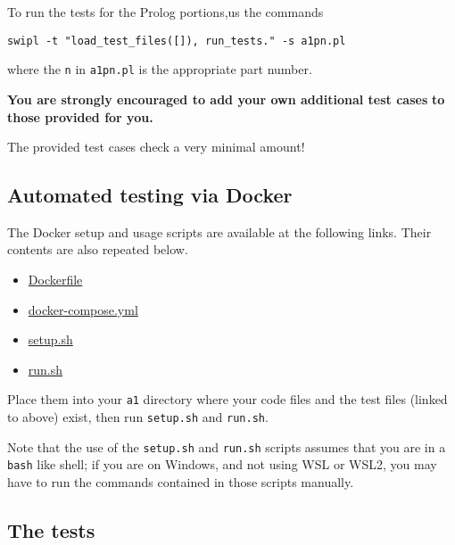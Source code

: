 \documentclass[11pt]{article}
\begin{document}
To run the tests for the Prolog portions,us the commands
\begin{verbatim}
swipl -t "load_test_files([]), run_tests." -s a1pn.pl
\end{verbatim}
where the \texttt{n} in \texttt{a1pn.pl} is the appropriate part number.

\begin{center}
\textbf{You are strongly encouraged to add your own additional test cases}
\textbf{to those provided for you.}

The provided test cases check a very minimal amount!
\end{center}

\subsection*{Automated testing via Docker}
\label{sec:org344048d}
The Docker setup and usage scripts are available at the following links.
Their contents are also repeated below.
\begin{itemize}
\item \href{./testing/a1/Dockerfile}{Dockerfile}
\item \href{./testing/a1/docker-compose.yml}{docker-compose.yml}
\item \href{./testing/a1/setup.sh}{setup.sh}
\item \href{./testing/a1/run.sh}{run.sh}
\end{itemize}
Place them into your \texttt{a1} directory where your code files
and the test files (linked to above) exist,
then run \texttt{setup.sh} and \texttt{run.sh}.

Note that the use of the \texttt{setup.sh} and \texttt{run.sh} scripts assumes
that you are in a \texttt{bash} like shell; if you are on Windows,
and not using WSL or WSL2, you may have
to run the commands contained in those scripts manually.

\subsection*{The tests}
\label{sec:orgfdbab34}
\end{document}
